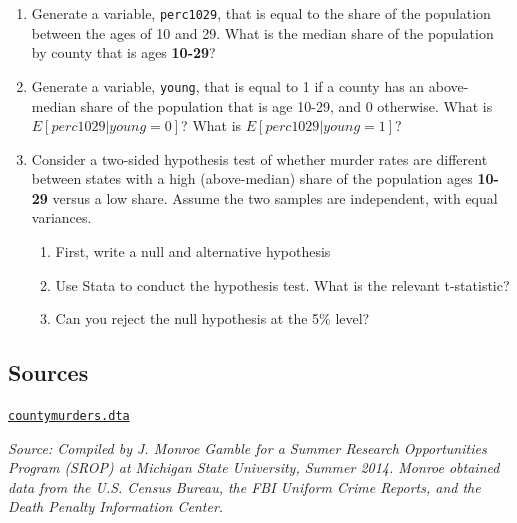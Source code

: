 \documentclass[
]{article}
\providecommand{\tightlist}{%
  \setlength{\itemsep}{0pt}\setlength{\parskip}{0pt}}
\begin{document}
\begin{enumerate}
\begin{enumerate}
    \begin{enumerate}
    \def\labelenumiii{\alph{enumiii}.}
    \tightlist
    \item
      First, write a null and alternative hypothesis
    \item
      Use Stata to conduct the hypothesis test. What is the relevant
      t-statistic?\footnote{The help file for \texttt{ttest} will be
        useful. Here we are conducting a two-sample t-test using groups.
        You will want to use the \texttt{highinc} variable you generated
        earlier.}
    \item
      Can you reject the null hypothesis at the 5\% level?
    \end{enumerate}
  \item
    Generate a variable, \texttt{perc1029}, that is equal to the share
    of the population between the ages of 10 and 29. What is the median
    share of the population by county that is ages \textbf{10-29}?
  \item
    Generate a variable, \texttt{young}, that is equal to 1 if a county
    has an above-median share of the population that is age 10-29, and 0
    otherwise. What is \(E[perc1029| young = 0]\)? What is
    \(E[perc1029| young =1]\)?
  \item
    Consider a two-sided hypothesis test of whether murder rates are
    different between states with a high (above-median) share of the
    population ages \textbf{10-29} versus a low share. Assume the two
    samples are independent, with equal variances.

    \begin{enumerate}
    \def\labelenumiii{\alph{enumiii}.}
    \tightlist
    \item
      First, write a null and alternative hypothesis
    \item
      Use Stata to conduct the hypothesis test. What is the relevant
      t-statistic?
    \item
      Can you reject the null hypothesis at the 5\% level?
    \end{enumerate}
  \end{enumerate}
\end{enumerate}

\subsection*{Sources}\label{sources}

\href{../countymurders.dta}{\texttt{countymurders.dta}}

\emph{Source: Compiled by J. Monroe Gamble for a Summer Research
Opportunities Program (SROP) at Michigan State University, Summer 2014.
Monroe obtained data from the U.S. Census Bureau, the FBI Uniform Crime
Reports, and the Death Penalty Information Center.}
\end{document}
